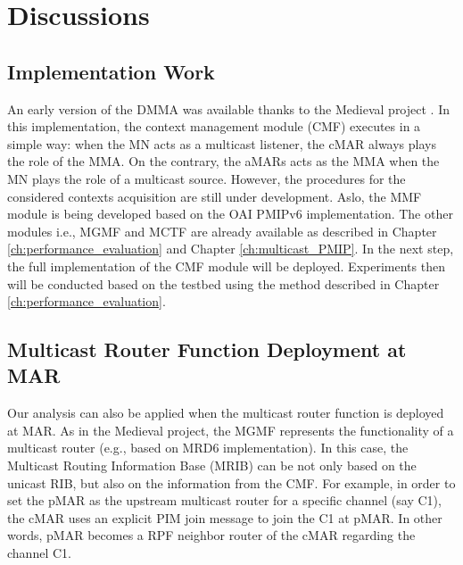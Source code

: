 \section{Discussions}\label{c10:discussion}
\subsection{Implementation Work}
An early version of the DMMA was available thanks to the Medieval project \cite{d4.4, d6.4, ICC_Sergio}. In this implementation, the context management module (CMF) executes in a simple way: when the MN acts as a multicast listener, the cMAR always plays the role of the MMA. On the contrary, the aMARs acts as the MMA when the MN plays the role of a multicast source. 
However, the procedures for the considered contexts acquisition are still under development. Aslo, the MMF module is being developed based on the OAI PMIPv6 implementation. The other modules i.e., MGMF and MCTF are already available as described in Chapter \ref{ch:performance_evaluation} and Chapter \ref{ch:multicast_PMIP}. In the next step, the full implementation of the CMF module will be deployed. Experiments then will be conducted based on the testbed using the method described in Chapter \ref{ch:performance_evaluation}. 


\subsection{Multicast Router Function Deployment at MAR}
Our analysis can also be applied when the multicast router function is deployed at MAR. As in the Medieval project, the MGMF represents the functionality of a multicast router (e.g., based on MRD6 implementation). In this case, the Multicast Routing Information Base (MRIB) can be not only based on the unicast RIB, but also on the information from the CMF. For example, in order to set the pMAR as the upstream multicast router for a specific channel (say C1), the cMAR uses an explicit PIM join message to join the C1 at pMAR. In other words, pMAR becomes a RPF neighbor router of the cMAR regarding the channel C1. 

